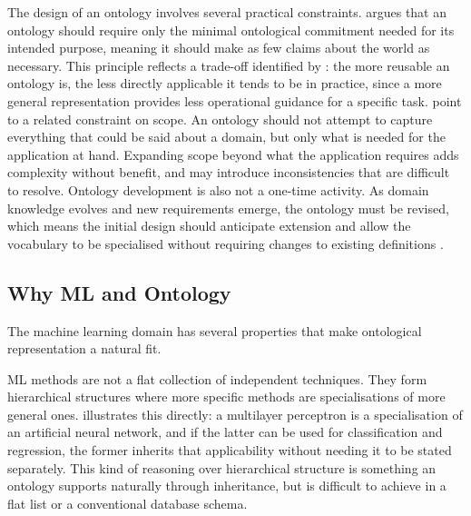 The design of an ontology involves several practical constraints.
\textcite{gruber1995toward_principles_design_ontologies_used_knowledge_sharing}
argues that an ontology should require only the minimal ontological
commitment needed for its intended purpose, meaning it should make
as few claims about the world as necessary.
This principle reflects a trade-off identified by
\textcite{studer1998knowledge_engineering_principles_methods}:
the more reusable an ontology is, the less directly applicable it
tends to be in practice, since a more general representation
provides less operational guidance for a specific task.
\textcite{noy2001ontology_development_101_guide_creating_first_ontology}
point to a related constraint on scope.
An ontology should not attempt to capture everything that could be
said about a domain, but only what is needed for the application at
hand.
Expanding scope beyond what the application requires adds complexity
without benefit, and may introduce inconsistencies that are difficult
to resolve.
Ontology development is also not a one-time activity.
As domain knowledge evolves and new requirements emerge, the
ontology must be revised, which means the initial design should
anticipate extension and allow the vocabulary to be specialised
without requiring changes to existing definitions
\parencite{gruber1995toward_principles_design_ontologies_used_knowledge_sharing,
noy2001ontology_development_101_guide_creating_first_ontology}.

\subsection{Why ML and Ontology}

The machine learning domain has several properties that make 
ontological representation a natural fit.

ML methods are not a flat collection of independent techniques.
They form hierarchical structures where more specific methods are 
specialisations of more general ones.
\textcite{humm2026industry_ready_machine_learning_ontology} 
illustrates this directly: a multilayer perceptron is a 
specialisation of an artificial neural network, and if the latter 
can be used for classification and regression, the former inherits 
that applicability without needing it to be stated separately.
This kind of reasoning over hierarchical structure is something an 
ontology supports naturally through inheritance, but is difficult 
to achieve in a flat list or a conventional database schema.

